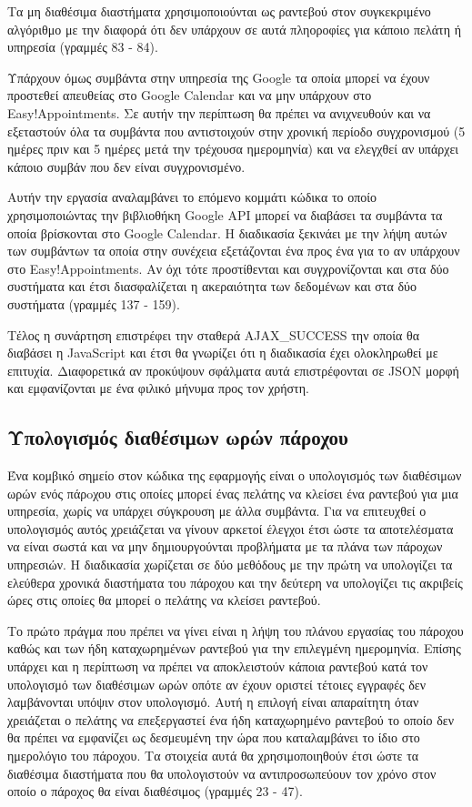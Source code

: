 Τα μη διαθέσιμα διαστήματα χρησιμοποιούνται ως ραντεβού στον συγκεκριμένο αλγόριθμο με την διαφορά ότι δεν υπάρχουν σε αυτά πληοροφίες για κάποιο πελάτη ή υπηρεσία (γραμμές 83 - 84).

Υπάρχουν όμως συμβάντα στην υπηρεσία της Google τα οποία μπορεί να έχουν προστεθεί απευθείας στο Google Calendar και να μην υπάρχουν στο Easy!Appointments. Σε αυτήν την περίπτωση θα πρέπει να ανιχνευθούν και να εξεταστούν όλα τα συμβάντα που αντιστοιχούν στην χρονική περίοδο συγχρονισμού (5 ημέρες πριν και 5 ημέρες μετά την τρέχουσα ημερομηνία) και να ελεγχθεί αν υπάρχει κάποιο συμβάν που δεν είναι συγχρονισμένο. 

Αυτήν την εργασία αναλαμβάνει το επόμενο κομμάτι κώδικα το οποίο χρησιμοποιώντας την βιβλιοθήκη Google API μπορεί να διαβάσει τα συμβάντα τα οποία βρίσκονται στο Google Calendar. Η διαδικασία ξεκινάει με την λήψη αυτών των συμβάντων τα οποία στην συνέχεια εξετάζονται ένα προς ένα για το αν υπάρχουν στο Easy!Appointments. Αν όχι τότε προστίθενται και συγχρονίζονται και στα δύο συστήματα και έτσι διασφαλίζεται η ακεραιότητα των δεδομένων και στα δύο συστήματα (γραμμές 137 - 159). 

Τέλος η συνάρτηση επιστρέφει την σταθερά AJAX\_SUCCESS την οποία θα διαβάσει η JavaScript και έτσι θα γνωρίζει ότι η διαδικασία έχει ολοκληρωθεί με επιτυχία. Διαφορετικά αν προκύψουν σφάλματα αυτά επιστρέφονται σε JSON μορφή και εμφανίζονται με ένα φιλικό μήνυμα προς τον χρήστη.

\subsection{Υπολογισμός διαθέσιμων ωρών πάροχου}
Ένα κομβικό σημείο στον κώδικα της εφαρμογής είναι ο υπολογισμός των διαθέσιμων ωρών ενός πάρoχου στις οποίες μπορεί ένας πελάτης να κλείσει ένα ραντεβού για μια υπηρεσία, χωρίς να υπάρχει σύγκρουση με άλλα συμβάντα. Για να επιτευχθεί ο υπολογισμός αυτός χρειάζεται να γίνουν αρκετοί έλεγχοι έτσι ώστε τα αποτελέσματα να είναι σωστά και να μην δημιουργούνται προβλήματα με τα πλάνα των πάροχων υπηρεσιών. Η διαδικασία χωρίζεται σε δύο μεθόδους με την πρώτη να υπολογίζει τα ελεύθερα χρονικά διαστήματα του πάροχου και την δεύτερη να υπολογίζει τις ακριβείς ώρες στις οποίες θα μπορεί ο πελάτης να κλείσει ραντεβού.



Το πρώτο πράγμα που πρέπει να γίνει είναι η λήψη του πλάνου εργασίας του πάροχου καθώς και των ήδη καταχωρημένων ραντεβού για την επιλεγμένη ημερομηνία. Επίσης υπάρχει και η περίπτωση να πρέπει να αποκλειστούν κάποια ραντεβού κατά τον υπολογισμό των διαθέσιμων ωρών οπότε αν έχουν οριστεί τέτοιες εγγραφές δεν λαμβάνονται υπόψιν στον υπολογισμό. Αυτή η επιλογή είναι απαραίτητη όταν χρειάζεται ο πελάτης να επεξεργαστεί ένα ήδη καταχωρημένο ραντεβού το οποίο δεν θα πρέπει να εμφανίζει ως δεσμευμένη την ώρα που καταλαμβάνει το ίδιο στο ημερολόγιο του πάροχου. Τα στοιχεία αυτά θα χρησιμοποιηθούν έτσι ώστε τα διαθέσιμα διαστήματα που θα υπολογιστούν να αντιπροσωπεύουν τον χρόνο στον οποίο ο πάροχος θα είναι διαθέσιμος (γραμμές 23 - 47).

